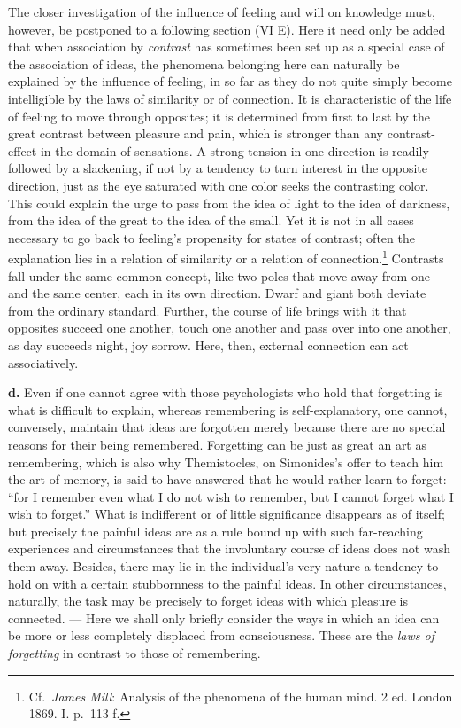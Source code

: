 \documentclass[12pt,a4paper]{book}
\newcommand{\opage}[1]{\marginnote{\footnotesize\textit{[#1]}}}
\begin{document}
The closer investigation of the influence of feeling and will on
knowledge must, however, be postponed to a following section (VI E).
Here it need only be added that when association by \emph{contrast} has
sometimes been set up as a special case of the association of ideas, the
phenomena belonging here can naturally be explained by the influence of
feeling, in so far as they do not quite simply become intelligible by
the laws of similarity or of connection. It is characteristic of the
life of feeling to move through opposites; it is determined from first
to last by the great contrast between pleasure and pain, which is
stronger than any contrast-effect in the domain of sensations. A strong
tension in one direction is readily followed by a slackening, if not by
a tendency to turn interest in the opposite direction, just as the eye
saturated with one color seeks the contrasting color. This could explain
the urge to pass from the idea of light to the idea of darkness, from
the idea of the great to the idea of the small. Yet it is not in all
cases necessary to go back to feeling's propensity for states of
contrast; often the explanation lies in a relation of similarity or a
\opage{196}relation of connection.\footnote{Cf.\ \emph{James Mill}:
Analysis of the phenomena of the human mind. 2 ed. London 1869. I.
p.~113 f.} Contrasts fall under the same common concept, like two poles
that move away from one and the same center, each in its own direction.
Dwarf and giant both deviate from the ordinary standard. Further, the
course of life brings with it that opposites succeed one another, touch
one another and pass over into one another, as day succeeds night, joy
sorrow. Here, then, external connection can act associatively.

\textbf{d.} Even if one cannot agree with those psychologists who hold
that forgetting is what is difficult to explain, whereas remembering is
self-explanatory, one cannot, conversely, maintain that ideas are
forgotten merely because there are no special reasons for their being
remembered. Forgetting can be just as great an art as remembering, which
is also why Themistocles, on Simonides's offer to teach him the art of
memory, is said to have answered that he would rather learn to forget:
``for I remember even what I do not wish to remember, but I cannot
forget what I wish to forget.'' What is indifferent or of little
significance disappears as of itself; but precisely the painful ideas
are as a rule bound up with such far-reaching experiences and
circumstances that the involuntary course of ideas does not wash them
away. Besides, there may lie in the individual's very nature a tendency
to hold on with a certain stubbornness to the painful ideas. In other
circumstances, naturally, the task may be precisely to forget ideas with
which pleasure is connected. --- Here we shall only briefly consider the
ways in which an idea can be more or less completely displaced from
consciousness. These are the \emph{laws of forgetting} in contrast to
those of remembering.
\end{document}
